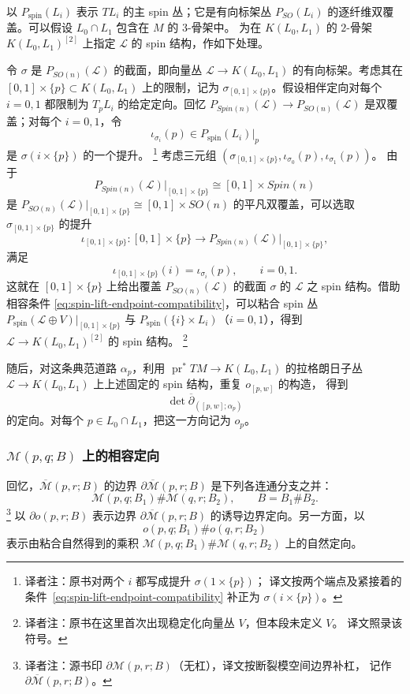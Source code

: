 以 $P_{\mathrm{spin}}(L_i)$ 表示 $TL_i$ 的主 spin 丛；它是有向标架丛
$P_{SO}(L_i)$ 的逐纤维双覆盖。可以假设 $L_0\cap L_1$ 包含在 $M$ 的 $3$-骨架中。
为在 $K(L_0,L_1)$ 的 $2$-骨架 $K(L_0,L_1)^{[2]}$ 上指定
$\mathcal L$ 的 spin 结构，作如下处理。

令 $\sigma$ 是 $P_{SO(n)}(\mathcal L)$ 的截面，即向量丛
$\mathcal L\to K(L_0,L_1)$ 的有向标架。考虑其在
$[0,1]\times\{p\}\subset K(L_0,L_1)$ 上的限制，记为
$\sigma_{[0,1]\times\{p\}}$。假设相伴定向对每个 $i=0,1$ 都限制为
$T_pL_i$ 的给定定向。回忆
$P_{Spin(n)}(\mathcal L)\to P_{SO(n)}(\mathcal L)$ 是双覆盖；对每个 $i=0,1$，令
\[
 \iota_{\sigma_i}(p)\in P_{\mathrm{spin}}(L_i)|_p
\]
是 $\sigma(i\times\{p\})$ 的一个提升。
\footnote{译者注：原书对两个 $i$ 都写成提升 $\sigma(1\times\{p\})$；
译文按两个端点及紧接着的条件~\eqref{eq:spin-lift-endpoint-compatibility}
补正为 $\sigma(i\times\{p\})$。}
考虑三元组
$(\sigma_{[0,1]\times\{p\}},\iota_{\sigma_0}(p),\iota_{\sigma_1}(p))$。
由于
\[
 P_{Spin(n)}(\mathcal L)|_{[0,1]\times\{p\}}
 \cong[0,1]\times Spin(n)
\]
是
$P_{SO(n)}(\mathcal L)|_{[0,1]\times\{p\}}
\cong[0,1]\times SO(n)$ 的平凡双覆盖，可以选取
$\sigma_{[0,1]\times\{p\}}$ 的提升
\[
 \iota_{[0,1]\times\{p\}}:[0,1]\times\{p\}
 \longrightarrow P_{Spin(n)}(\mathcal L)|_{[0,1]\times\{p\}},
\]
满足
\begin{equation}
 \iota_{[0,1]\times\{p\}}(i)=\iota_{\sigma_i}(p),
 \qquad i=0,1.
 \label{eq:spin-lift-endpoint-compatibility}
\end{equation}
这就在 $[0,1]\times\{p\}$ 上给出覆盖 $P_{SO(n)}(\mathcal L)$ 的截面
$\sigma$ 的 $\mathcal L$ 之 spin 结构。借助相容条件
\eqref{eq:spin-lift-endpoint-compatibility}，可以粘合 spin 丛
$P_{\mathrm{spin}}(\mathcal L\oplus V)|_{[0,1]\times\{p\}}$ 与
$P_{\mathrm{spin}}(\{i\}\times L_i)$（$i=0,1$），得到
$\mathcal L\to K(L_0,L_1)^{[2]}$ 的 spin 结构。
\footnote{译者注：原书在这里首次出现稳定化向量丛 $V$，但本段未定义 $V$。
译文照录该符号。}

随后，对这条典范道路 $\alpha_p$，利用
$\operatorname{pr}^*TM\to K(L_0,L_1)$ 的拉格朗日子丛
$\mathcal L\to K(L_0,L_1)$ 上上述固定的 spin 结构，重复 $o_{[p,w]}$ 的构造，
得到\termDeterminantLineBundle{}
\[
 \det\overline\partial_{([p,w];\alpha_p)}
\]
的定向。对每个 $p\in L_0\cap L_1$，把这一方向记为 $o_p$。

\subsubsection*{$\mathcal M(p,q;B)$ 上的相容定向}
回忆，$\overline{\mathcal M}(p,r;B)$ 的边界
$\partial\overline{\mathcal M}(p,r;B)$ 是下列各连通分支之并：
\[
 \mathcal M(p,q;B_1)\#\mathcal M(q,r;B_2),
 \qquad B=B_1\#B_2.
\]
\footnote{译者注：源书印 $\partial\mathcal M(p,r;B)$（无杠），译文按断裂模空间边界补杠，
记作 $\partial\overline{\mathcal M}(p,r;B)$。}
以 $\partial o(p,r;B)$ 表示边界
$\partial\overline{\mathcal M}(p,r;B)$ 的诱导边界定向。另一方面，以
\[
 o(p,q;B_1)\#o(q,r;B_2)
\]
表示由粘合\termVirtualTangentSpace{}自然得到的乘积
$\mathcal M(p,q;B_1)\#\mathcal M(q,r;B_2)$ 上的自然定向。

